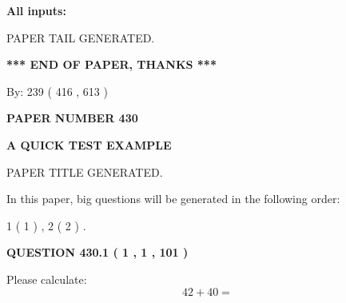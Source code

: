 \documentclass[12pt]{article}
\begin{document}
   
\noindent{}
   
   
   
   
\noindent\vspace{0.1in}\hspace{-0.08in} {\textbf{\Large{All inputs: }}}
   
   
   
   
   
   
 \vspace{0.2in}
 
   
   
\vspace{2.0in} PAPER TAIL GENERATED.
   
   
   
   
\vspace{1.0in} 
{\textbf{\large{ *** END OF PAPER, THANKS *** }}} 
   
   
\hspace{1.0in} By: 
 239 ( 416 ,  613 )
   
   
   
   
\newpage 
\setcounter{page}{ 
   430001 } 
   
   
   
   
 {\textbf{ \Large{ PAPER NUMBER  430  }}}
   
   
\vspace{0.2in}
   
   
   
   
   
   
   
   
 \vspace{0.2in}
{\LARGE {\textbf{ A QUICK TEST EXAMPLE}}}
   
   
 PAPER TITLE GENERATED.
   
   
   
\vspace{0.2in}
   
In this paper, big questions will be generated in the following order: 
   
   
   1 ( 1 )
 ,
   2 ( 2 )
 .
  
\vspace{0.2in}
  
{\textbf{\Large{QUESTION
430.1 
 ( 1 , 1 , 101 )
}}}
  
  
 
Please calculate:
\begin{equation}
42 +  %
40 = \nonumber
\end{equation}
 
\end{document}
